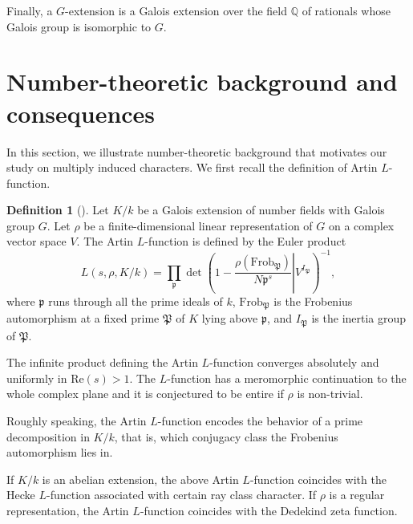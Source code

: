 \documentclass[a4paper,12pt]{article}
\newcommand{\field}[1]{\mathbb{#1}}
\newcommand{\Q}{\field{Q}}
\theoremstyle{definition}
\newtheorem{definition}[theorem]{Definition}
\theoremstyle{remark}
\numberwithin{equation}{section}
\begin{document}
Finally, a $G$-extension is a Galois extension over the field $\Q$ of rationals
whose Galois group is isomorphic to $G$.

\section{Number-theoretic background and consequences} \label{sec:2}
In this section, we illustrate number-theoretic background that motivates our study on multiply induced characters.
We first recall the definition of Artin $L$-function. 

\begin{definition}[]
Let $K/k$ be a Galois extension of number fields with Galois group $G$.
Let $\rho $ be a finite-dimensional linear representation of $G$ on a complex vector space $V$.
The Artin $L$-function is defined by the Euler product
\[
L( s, \rho , K/k) = \prod_{\mathfrak{p}}  \det 
\left( \left. 1 - \frac{\rho(\mathrm{Frob}_{\mathfrak{P}})}{N \mathfrak{p}^{s}} \right| 
V^{I_{\mathfrak{P}}}\right)^{-1},
\]
where $\mathfrak{p}$ runs through all the prime ideals of $k$, $\mathrm{Frob}_{\mathfrak{P}}$ is 
the Frobenius automorphism at a fixed prime $\mathfrak{P}$ of $K$ lying above $\mathfrak{p}$, and $I_{\mathfrak{P}}$ is 
the inertia group of $\mathfrak{P}$.
\end{definition}

The infinite product defining the Artin $L$-function converges absolutely and uniformly in $\mathrm{Re} (s) >1$.
The $L$-function has a meromorphic continuation to the whole complex plane and 
it is conjectured to be entire if $\rho $ is non-trivial.

Roughly speaking, the Artin $L$-function encodes the behavior of a prime decomposition 
in $K/k$, that is, which conjugacy class the Frobenius automorphism lies in.

If $K/k$ is an abelian extension, the above Artin $L$-function coincides with the Hecke $L$-function
associated with certain ray class character. If $\rho$ is a regular representation, 
the Artin $L$-function coincides with the Dedekind zeta function.
\end{document}
